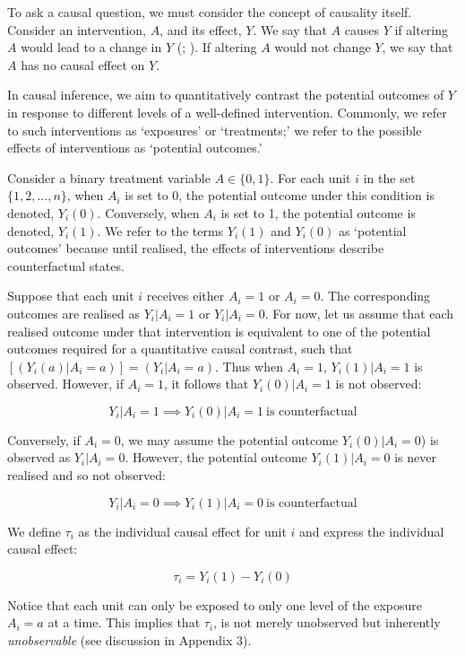 \documentclass[
  singlecolumn]{article}
\begin{document}
To ask a causal question, we must consider the concept of causality
itself. Consider an intervention, \(A\), and its effect, \(Y\). We say
that \(A\) causes \(Y\) if altering \(A\) would lead to a change in
\(Y\) (;
). If altering \(A\) would not
change \(Y\), we say that \(A\) has no causal effect on \(Y\).

In causal inference, we aim to quantitatively contrast the potential
outcomes of \(Y\) in response to different levels of a well-defined
intervention. Commonly, we refer to such interventions as `exposures' or
`treatments;' we refer to the possible effects of interventions as
`potential outcomes.'

Consider a binary treatment variable \(A \in \{0,1\}\). For each unit
\(i\) in the set \(\{1, 2, \ldots, n\}\), when \(A_i\) is set to 0, the
potential outcome under this condition is denoted, \(Y_i(0)\).
Conversely, when \(A_i\) is set to 1, the potential outcome is denoted,
\(Y_i(1)\). We refer to the terms \(Y_i(1)\) and \(Y_i(0)\) as
`potential outcomes' because until realised, the effects of
interventions describe counterfactual states.

Suppose that each unit \(i\) receives either \(A_i = 1\) or \(A_i = 0\).
The corresponding outcomes are realised as \(Y_i|A_i = 1\) or
\(Y_i|A_i = 0\). For now, let us assume that each realised outcome under
that intervention is equivalent to one of the potential outcomes
required for a quantitative causal contrast, such that
\([(Y_i(a)|A_i = a)] = (Y_i|A_i = a)\). Thus when \(A_i = 1\),
\(Y_i(1)|A_i = 1\) is observed. However, if \(A_i = 1\), it follows that
\(Y_i(0)|A_i = 1\) is not observed:

\[
Y_i|A_i = 1 \implies Y_i(0)|A_i = 1~ \text{is counterfactual}
\]

Conversely, if \(A_i = 0\), we may assume the potential outcome
\(Y_i(0)|A_i = 0\)) is observed as \(Y_i|A_i = 0\). However, the
potential outcome \(Y_i(1)|A_i = 0\) is never realised and so not
observed:

\[
Y_i|A_i = 0 \implies Y_i(1)|A_i = 0~ \text{is counterfactual}
\]

We define \(\tau_i\) as the individual causal effect for unit \(i\) and
express the individual causal effect:

\[
\tau_i = Y_i(1) - Y_i(0)
\]

Notice that each unit can only be exposed to only one level of the
exposure \(A_i = a\) at a time. This implies that \(\tau_i\), is not
merely unobserved but inherently \emph{unobservable} (see discussion in
Appendix 3).
\end{document}
